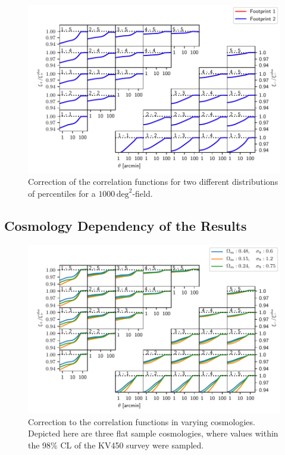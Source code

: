 \documentclass[referee]{aa} %
\renewcommand{\[}{\begin{equation}}
\renewcommand{\]}{\end{equation}}
\renewcommand{\rm}{\mathrm}
\begin{document}
\begin{appendix}
\begin{figure}[h]
\centering
\includegraphics[width=\textwidth]{images/1000degtwofoot_final.pdf}
\caption[Correction of the correlation functions for a $1000\,\rm{deg}^2$-field.] {Correction of the correlation functions for two different distributions of percentiles for a $1000\,\rm{deg}^2$-field.}
\label{fig:1000degsqr}
\end{figure}

\subsection{Cosmology Dependency of the Results}
\begin{figure}[h]
\centering
\includegraphics[width=\textwidth]{images/compare_cosmos.pdf}
\caption{Correction to the correlation functions in varying cosmologies. Depicted here are three flat sample cosmologies, where values within the 98\% CL of the KV450 survey were sampled.}
\label{fig:comparecosmo}
\end{figure}
\end{appendix}
\end{document}

